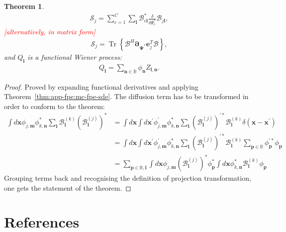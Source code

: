 \documentclass[12pt,aip,jmp,amssymb,amsmath]{revtex4-1}
\newcommand{\todo}[1]{\textcolor{red}{[#1]}}
\newcommand{\lvec}{\boldsymbol{l}}
\newcommand{\mvec}{\boldsymbol{m}}
\newcommand{\nvec}{\boldsymbol{n}}
\newcommand{\pvec}{\boldsymbol{p}}
\newcommand{\xvec}{\boldsymbol{x}}
\newcommand{\bpartial}{\boldsymbol{\partial}}
\newcommand{\bPsi}{\boldsymbol{\Psi}}
\newcommand{\Trace}[1]{\operatorname{Tr} \left\{ #1 \right\}}
\newcommand{\fullbasis}{\mathbb{B}}
\newcommand{\thmref}[1]{Theorem~\ref{thm:#1}}
\newtheorem{theorem}{Theorem}
\begin{document}
\begin{theorem}
\begin{equation*}
\begin{split}
        \mathcal{S}_j = \sum_{c=1}^C \sum_{\lvec}
            \mathcal{B}_{c \lvec}^*
            \frac{\delta}{\delta \Psi_c^*}
            \mathcal{B}_{j \lvec},
    \end{split}\end{equation*}
    \todo{alternatively, in matrix form}
    \begin{equation*}\begin{split}
        \mathcal{S}_j = \Trace{ \mathcal{B}^H \bpartial_{\bPsi^*} \boldsymbol{e}_j^T \mathcal{B} },
    \end{split}\end{equation*}
    and $Q_{\lvec}$ is a functional Wiener process:
    \begin{equation*}\begin{split}
        Q_{\lvec} = \sum_{\nvec \in \fullbasis} \phi_{\nvec} Z_{\lvec,\nvec}.
    \end{split}\end{equation*}
\end{theorem}
\begin{proof}
Proved by expanding functional derivatives and applying \thmref{app-fpe:mc-fpe-sde}.
The diffusion term has to be transformed in order to conform to the theorem:
\begin{equation}\begin{split}
    \int d\xvec \phi_{j,\mvec} \phi_{k,\nvec}^* \sum_{\lvec} \mathcal{B}_{\lvec}^{(k)} (\mathcal{B}_{\lvec}^{(j)})^*
    & = \int d\xvec \int d\xvec^\prime
            \phi_{j,\mvec}^\prime \phi_{k,\nvec}^*
            \sum_{\lvec} (\mathcal{B}_{\lvec}^{(j)})^{\prime *} \mathcal{B}_{\lvec}^{(k)}
            \delta(\xvec - \xvec^\prime) \\
    & = \int d\xvec \int d\xvec^\prime
            \phi_{j,\mvec}^\prime \phi_{k,\nvec}^*
            \sum_{\lvec} (\mathcal{B}_{\lvec}^{(j)})^{\prime *} \mathcal{B}_{\lvec}^{(k)}
            \sum_{\pvec \in \fullbasis} \phi_{\pvec}^{\prime*} \phi_{\pvec} \\
    & = \sum_{\pvec \in \fullbasis, \lvec}
        \int d\xvec
            \phi_{j,\mvec} (\mathcal{B}_{\lvec}^{(j)})^* \phi_{\pvec}^*
        \int d\xvec
            \phi_{k,\nvec}^* \mathcal{B}_{\lvec}^{(k)} \phi_{\pvec}
\end{split}\end{equation}
Grouping terms back and recognising the definition of projection transformation, one gets the statement of the theorem.
\end{proof}



\section*{References}
%

\end{document}
